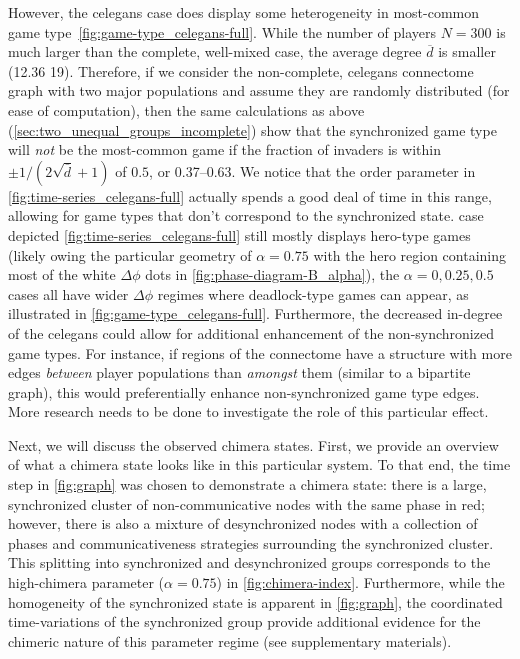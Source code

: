 \documentclass[pdflatex,lineno,referee,sn-nature]{sn-jnl}
\begin{document}
However, the \gls{celegans} case does display some heterogeneity
in most-common game type~\cref{fig:game-type_celegans-full}.
While the number of players $N = 300$ is much larger
than the complete, well-mixed case,
the average degree $\overline{d}$
is smaller (\num{12.36} \vs \num{19}).
Therefore, if we consider the non-complete, \gls{celegans} connectome graph
with two major populations
and assume they are randomly distributed (for ease of computation),
then the same calculations as above
(\cf \cref{sec:two_unequal_groups_incomplete}) show that
the synchronized game type will \emph{not} be the most-common game
if the fraction of invaders is within
$\pm 1/(2 \sqrt{\overline{d}} + 1)$
of $0.5$, or \numrange{0.37}{0.63}.
We notice that the order parameter in \cref{fig:time-series_celegans-full}
actually spends a good deal of time in this range,
allowing for game types that don't correspond to the synchronized state.
 case depicted \cref{fig:time-series_celegans-full}
still mostly displays hero-type games
(likely owing the particular geometry of $\alpha = 0.75$
with the hero region containing most of the white $\Delta \phi$ dots
in \cref{fig:phase-diagram-B_alpha}),
the $\alpha = 0, 0.25, 0.5$ cases all have wider $\Delta \phi$ regimes where
deadlock-type games can appear, as illustrated in \cref{fig:game-type_celegans-full}.
Furthermore, the decreased in-degree of the \gls{celegans} could allow
for additional enhancement of the non-synchronized game types.
For instance, if regions of the connectome have a structure with more edges
\emph{between} player populations than \emph{amongst} them
(similar to a bipartite graph),
this would preferentially enhance non-synchronized game type edges.
More research needs to be done to investigate the role of this particular effect.

Next, we will discuss the observed chimera states.
First, we provide an overview of what a chimera state
looks like in this particular system.
To that end, the time step in \cref{fig:graph} was chosen
to demonstrate a chimera state:
there is a large, synchronized cluster
of non-communicative nodes with the same phase in red;
however, there is also a mixture of desynchronized nodes
with a collection of phases and communicativeness strategies
surrounding the synchronized cluster.
This splitting into synchronized and desynchronized groups
corresponds to the high-chimera parameter ($\alpha = 0.75$)
in \cref{fig:chimera-index}.
Furthermore, while the homogeneity of the synchronized state is apparent
in \cref{fig:graph},
the coordinated time-variations of the synchronized group
provide additional evidence for the chimeric nature
of this parameter regime (see supplementary materials).
\end{document}
